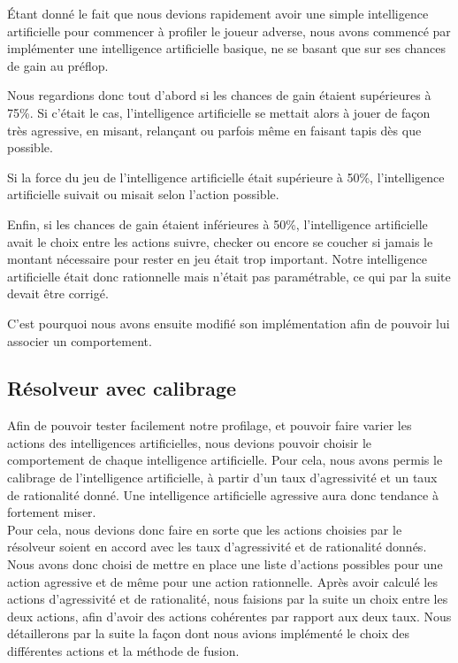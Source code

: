 \documentclass{report}
\begin{document}
Étant donné le fait que nous devions rapidement avoir une simple intelligence artificielle pour commencer à profiler le joueur adverse, nous avons commencé par implémenter une intelligence artificielle basique, ne se basant que sur ses chances de gain au préflop.\par 
Nous regardions donc tout d'abord si les chances de gain étaient supérieures à 75\%. Si c'était le cas, l'intelligence artificielle se mettait alors à jouer de façon très agressive, en misant, relançant ou parfois même en faisant tapis dès que possible.\par
Si la force du jeu de l'intelligence artificielle était supérieure à 50\%, l'intelligence artificielle suivait ou misait selon l'action possible.\par
Enfin, si les chances de gain étaient inférieures à 50\%, l'intelligence artificielle avait le choix entre les actions suivre, checker ou encore se coucher si jamais le montant nécessaire pour rester en jeu était trop important. Notre intelligence artificielle était donc rationnelle mais n'était pas paramétrable, ce qui par la suite devait être corrigé. \par
C'est pourquoi nous avons ensuite modifié son implémentation afin de pouvoir lui associer un comportement.\par

\subsection{Résolveur avec calibrage}

\hspace{0.5cm}Afin de pouvoir tester facilement notre profilage, et pouvoir faire varier les actions des intelligences artificielles, nous devions pouvoir choisir le comportement de chaque intelligence artificielle. Pour cela, nous avons permis le calibrage de l'intelligence artificielle, à partir d'un taux d'agressivité et un taux de rationalité donné. Une intelligence artificielle agressive aura donc tendance à fortement miser.\\

Pour cela, nous devions donc faire en sorte que les actions choisies par le résolveur soient en accord avec les taux d'agressivité et de rationalité donnés. Nous avons donc choisi de mettre en place une liste d'actions possibles pour une action agressive et de même pour une action rationnelle. Après avoir calculé les actions d'agressivité et de rationalité, nous faisions par la suite un choix entre les deux actions, afin d'avoir des actions cohérentes par rapport aux deux taux. Nous détaillerons par la suite la façon dont nous avions implémenté le choix des différentes actions et la méthode de fusion.\par
\end{document}
